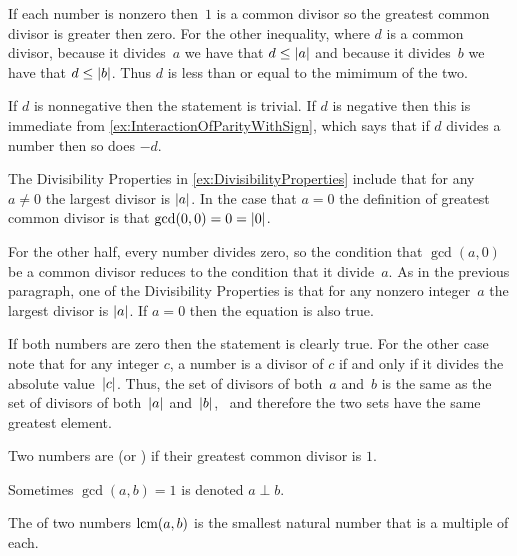 \documentclass{ibl}
\begin{document}
\begin{ex}
\begin{ans}
\begin{exes}
  If each number is nonzero then~$1$ is a common divisor so 
  the greatest common divisor is greater then zero.
  For the other inequality,
  where $d$ is a common divisor, 
  because it divides~$a$ we have that $d\leq\lvert a\rvert$ and
  because it divides~$b$ we have that $d\leq\lvert b\rvert$.
  Thus $d$ is less than or equal to the mimimum of the two. 
\item If $d$ is nonnegative then the statement is trivial.
  If $d$ is negative then
  this is immediate from \ref{ex:InteractionOfParityWithSign},
  which says that if $d$ divides a number then so does $-d$.
\item The Divisibility Properties in \ref{ex:DivisibilityProperties}
  include that for any~$a\neq 0$ the largest divisor is $\lvert a\rvert$.
  In the case that $a=0$ the definition of greatest common divisor 
  is that $\gcd(0,0)=0=\lvert0\rvert$.

  For the other half, 
  every number divides zero, so the condition that $\gcd(a,0)$ be a common
  divisor reduces to the condition that it divide~$a$.
  As in the previous paragraph, one of the Divisibility Properties  
  is that for any nonzero integer~$a$ the largest divisor is $\lvert a\rvert$.
  If $a=0$ then the equation is also true.
\item If both numbers are zero then the statement is clearly true.
  For the other case note that for any
  integer $c$, a number is a divisor of $c$ if and only if it divides 
  the absolute value~$\lvert c\rvert$.
  Thus, the set of divisors of both~$a$ and~$b$ 
  is the same as the set of divisors of both~$\lvert a\rvert$ and~$\lvert b\rvert$, \
  and therefore the two sets have the same greatest element.
\end{exes}
\end{ans}
\end{ex}

\begin{df}
Two numbers are  
(or ) if their greatest common divisor is $1$.
\end{df}

\noindent Sometimes $\gcd(a,b)=1$ is denoted $a\perp b$.

\begin{df}
The  of two numbers $\operatorname{lcm}(a,b)$ 
is the smallest natural number that is a multiple of each.
\end{df}
\end{document}
